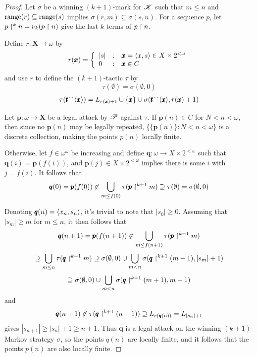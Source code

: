 \documentclass{amsart}
\theoremstyle{definition}
\begin{document}
\begin{proof}
  Let $\sigma$ be a winning $(k+1)$-mark for $\mathscr{K}$ such that $m\leq n$ and
  $\text{range}(r) \subseteq \text{range}(s)$ implies $\sigma(r,m)\subseteq\sigma(s,n)$.
  For a sequence $p$, let $p\restriction^k n=\nu_k(p\restriction n)$ give the last $k$
  terms of $p\restriction n$.

  Define $r:\pmb X\to\omega$ by
    \[
      r(\pmb x)
        =
      \left\{
        \begin{array}{lcl}
          |s|
        & : &
          \pmb x = \langle x,s\rangle \in X\times 2^{<\omega}
        \\
          0
        & : &
          \pmb x \in C
        \end{array}
      \right.
    \]
  and use $r$ to define the $(k+1)$-tactic $\tau$ by
    \[
      \tau(\emptyset)
        =
      \sigma(\emptyset,0)
    \]
    \[
      \tau(\pmb t{^\frown}\langle\pmb x\rangle)
        =
      L_{r(\pmb x)+1}
        \cup
      \{\pmb x\}
        \cup
      \sigma(\pmb t{^\frown}\langle\pmb x\rangle,r(\pmb x)+1)
    \]

  Let $\pmb p:\omega\to\pmb X$ be a legal attack by $\mathscr{P}$ against $\tau$.
  If $\pmb p(n)\in C$ for $N<n<\omega$, then since no $\pmb p(n)$ may be legally
  repeated, $\{\{\pmb p(n)\}:N<n<\omega\}$ is a discrete collection, making
  the points $p(n)$ locally finite.

  Otherwise, let $f\in\omega^\omega$ be increasing and define
  $\pmb q:\omega\to X\times 2^{<\omega}$ such that $\pmb q(i)=\pmb p(f(i))$,
  and $\pmb p(j)\in X\times 2^{<\omega}$ implies there is some $i$ with $j=f(i)$.
  It follows that
    \[
      \pmb q(0)
        =
      \pmb p(f(0))
        \not\in
      \bigcup_{m\leq f(0)}\tau(\pmb p \restriction^{k+1} m)
        \supseteq
      \tau(\emptyset)
        =
      \sigma(\emptyset,0)
    \]

  Denoting $\pmb q(n)=\langle x_n,s_n\rangle$, it's trivial to note that $|s_0|\geq 0$.
  Assuming that $|s_m|\geq m$ for $m\leq n$,
  it then follows that
    \[
      \pmb q(n+1)
        =
      \pmb p(f(n+1))
        \not\in
      \bigcup_{m\leq f(n+1)}\tau(\pmb p\restriction^{k+1} m)
    \]
    \[
        \supseteq
      \bigcup_{m\leq n}\tau(\pmb q\restriction^{k+1} m)
        \supseteq
      \sigma(\emptyset,0)
        \cup
      \bigcup_{m < n}\sigma(\pmb q\restriction^{k+1} (m+1),|s_m|+1)
    \]
    \[
        \supseteq
      \sigma(\emptyset,0)
        \cup
      \bigcup_{m < n}\sigma(\pmb q\restriction^{k+1} (m+1),m+1)
    \]
  and
    \[
      \pmb q(n+1)
        \not\in
      \tau(\pmb q\restriction^{k+1} (n+1))
        \supseteq
      L_{r(\pmb q(n))}
        =
      L_{|s_n|+1}
    \]
  gives $|s_{n+1}|\geq|s_n|+1\geq n+1$.
  Thus $\pmb q$ is a legal attack on the winning $(k+1)$-Markov strategy
  $\sigma$, so the points $q(n)$ are locally finite,
  and it follows that the points $p(n)$ are also locally finite.
\end{proof}
\end{document}
